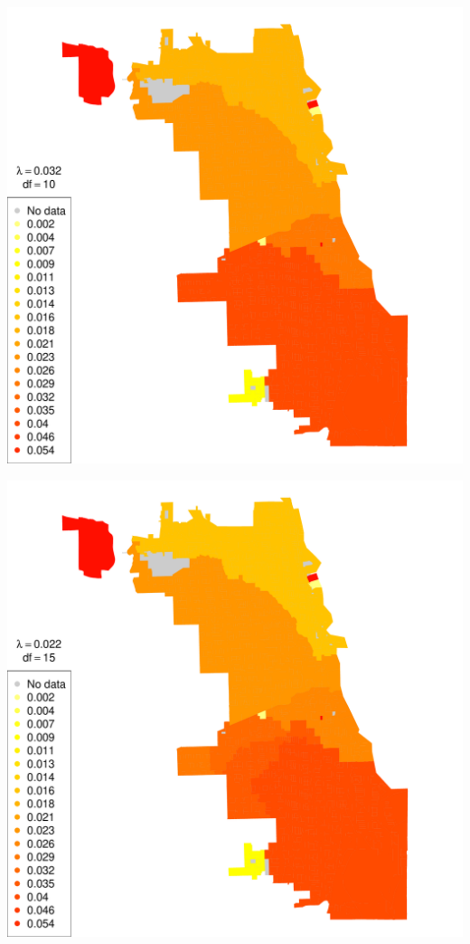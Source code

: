 \begin{frame}

  \includegraphics[height=\textheight]{img/chicago_rob_10df.pdf}

\end{frame}

\begin{frame}

  \includegraphics[height=\textheight]{img/chicago_rob_15df.pdf}

\end{frame}


